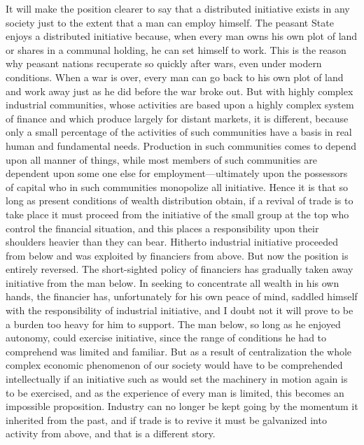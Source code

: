 \documentclass{book}
\begin{document}
It will make the position clearer to say that a distributed initiative exists in any society just to the extent that a man can employ himself. The peasant State enjoys a distributed initiative because, when every man owns his own plot of land or shares in a communal holding, he can set himself to work. This is the reason why peasant nations recuperate so quickly after wars, even under modern conditions. When a war is over, every man can go back to his own plot of land and work away just as he did before the war broke out. But with highly complex industrial communities, whose activities are based upon a highly complex system of finance and which produce largely for distant markets, it is different, because only a small percentage of the activities of such communities have a basis in real human and fundamental needs. Production in such communities comes to depend upon all manner of things, while most members of such communities are dependent upon some one else for employment—ultimately upon the possessors of capital who in such communities monopolize all initiative. Hence it is that so long as present conditions of wealth distribution obtain, if a revival of trade is to take place it must proceed from the initiative of the small group at the top who control the financial situation, and this places a responsibility upon their shoulders heavier than they can bear. Hitherto industrial initiative proceeded from below and was exploited by financiers from above. But now the position is entirely reversed. The short-sighted policy of financiers has gradually taken away initiative from the man below. In seeking to concentrate all wealth in his own hands, the financier has, unfortunately for his own peace of mind, saddled himself with the responsibility of industrial initiative, and I doubt not it will prove to be a burden too heavy for him to support. The man below, so long as he enjoyed autonomy, could exercise initiative, since the range of conditions he had to comprehend was limited and familiar. But as a result of centralization the whole complex economic phenomenon of our society would have to be comprehended intellectually if an initiative such as would set the machinery in motion again is to be exercised, and as the experience of every man is limited, this becomes an impossible proposition. Industry can no longer be kept going by the momentum it inherited from the past, and if trade is to revive it must be galvanized into activity from above, and that is a different story.
\end{document}
